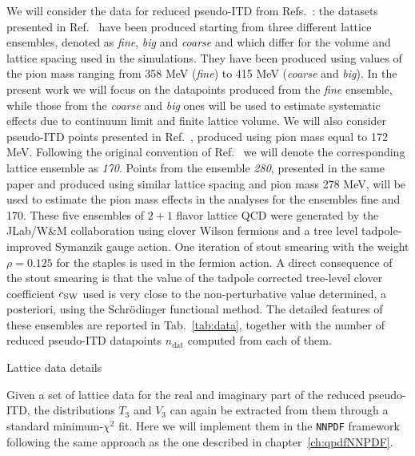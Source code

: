 %
We will consider the data for reduced pseudo-ITD from Refs.~\cite{Joo:2019jct, Joo:2020spy}:
the datasets presented in Ref.~\cite{Joo:2019jct} have been produced starting from three different lattice 
ensembles, denoted as \textit{fine}, \textit{big} and \textit{coarse} and which differ for the volume and lattice spacing 
used in the simulations. They have been produced using values of the pion mass ranging from 358 MeV (\textit{fine})
to 415 MeV (\textit{coarse} and \textit{big}). 
In the present work we will focus on the datapoints produced from the \textit{fine} ensemble, 
while those from the \textit{coarse} and \textit{big} ones will be used to estimate systematic effects due to continuum limit 
and finite lattice volume.
We will also consider pseudo-ITD points presented in Ref.~\cite{Joo:2020spy}, produced using pion mass equal to 172 MeV.
Following the original convention of Ref.~\cite{Joo:2020spy} we will denote the corresponding lattice ensemble as \textit{170}.
Points from the ensemble \textit{280}, presented in the same paper and produced using similar lattice spacing and pion mass 278 MeV,
will be used to estimate the pion mass effects in the analyses for the ensembles fine and 170.
%
These five ensembles of $2+1$ flavor lattice QCD were generated by the JLab/W\&M collaboration using clover Wilson fermions 
and a tree level tadpole-improved Symanzik gauge action. One iteration of stout smearing with the weight $ \rho = 0.125$ 
for the staples is used in the fermion action. 
A direct consequence of the stout smearing is that the value of the tadpole corrected tree-level clover coefficient $c_{\rm SW}$ 
used is very close to the non-perturbative value determined, a posteriori, using the Schr\"odinger functional method.
The detailed features of these ensembles are reported in Tab.~\ref{tab:data},
together with the number of reduced pseudo-ITD datapoints $n_{\text{dat}}$ computed from each of them.
\begin{table}[t]
	\renewcommand*{\arraystretch}{1.60}
	\scriptsize
	\centering
	
	\vspace{0.3cm}
	\caption{Lattice data details}
	\label{tab:data}
\end{table}

Given a set of lattice data for the real and imaginary part of the reduced pseudo-ITD, 
the distributions $T_3$ and $V_3$ can again be extracted from them through a standard minimum-$\chi^2$ fit.
Here we will implement them in the {\tt NNPDF} framework following the same approach as the one
described in chapter~\ref{ch:qpdfNNPDF}.


